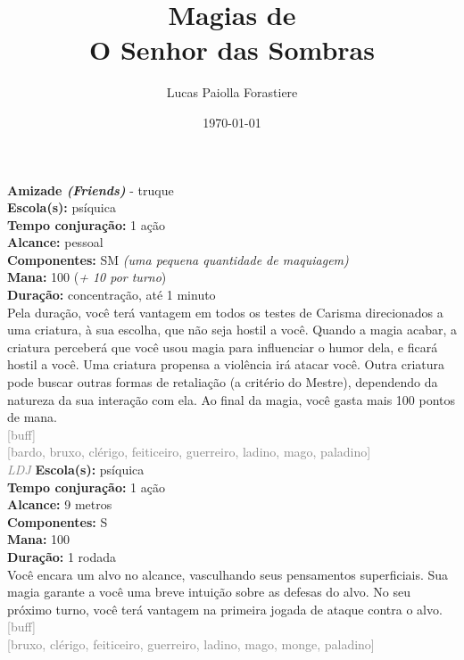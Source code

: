 \documentclass{RPG_Adventure}[2021/10/20]
\title{Magias de\\ \Huge{O Senhor das Sombras}}
\date{\today}
\author{Lucas Paiolla Forastiere}
\begin{document}
\maketitle

{\normalsize \textbf{Amizade \textit{(Friends)}} - truque\\}
{\small \t \textbf{Escola(s):} psíquica\\\t \textbf{Tempo conjuração:} 1 ação\\\t \textbf{Alcance:} pessoal\\\t \textbf{Componentes:} SM \textit{(uma pequena quantidade de maquiagem)}\\\t \textbf{Mana:} 100 (\textit{+ 10 por turno})\\\t \textbf{Duração:} concentração, até 1 minuto\\}
{\normalsize Pela duração, você terá vantagem em todos os testes de Carisma direcionados a uma criatura, à sua escolha, que não seja hostil a você. Quando a magia acabar, a criatura perceberá que você usou magia para influenciar o humor dela, e ficará hostil a você. Uma criatura propensa a violência irá atacar você. Outra criatura pode buscar outras formas de retaliação (a critério do Mestre), dependendo da natureza da sua interação com ela. Ao final da magia, você gasta mais 100 pontos de mana.\\}
{\scriptsize \textcolor{gray}{[buff]\\}}
{\scriptsize \textcolor{gray}{[bardo, bruxo, clérigo, feiticeiro, guerreiro, ladino, mago, paladino]\\}}
{\tiny \textcolor{gray}{\textit{LDJ}}}
{\small \t \textbf{Escola(s):} psíquica\\\t \textbf{Tempo conjuração:} 1 ação\\\t \textbf{Alcance:} 9 metros\\\t \textbf{Componentes:} S\\\t \textbf{Mana:} 100\\\t \textbf{Duração:} 1 rodada\\}
{\normalsize Você encara um alvo no alcance, vasculhando seus pensamentos superficiais. Sua magia garante a você uma breve intuição sobre as defesas do alvo. No seu próximo turno, você terá vantagem na primeira jogada de ataque contra o alvo.\\}
{\scriptsize \textcolor{gray}{[buff]\\}}
{\scriptsize \textcolor{gray}{[bruxo, clérigo, feiticeiro, guerreiro, ladino, mago, monge, paladino]\\}}
\end{document}
